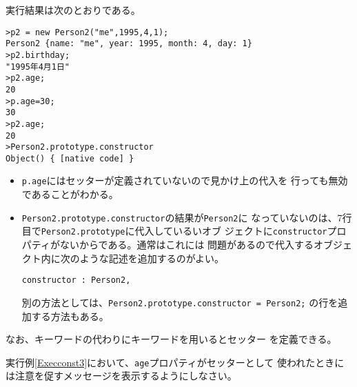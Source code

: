  実行結果は次のとおりである。
\begin{Verbatim}
>p2 = new Person2("me",1995,4,1);
Person2 {name: "me", year: 1995, month: 4, day: 1}
>p2.birthday;
"1995年4月1日"
>p2.age;
20
>p.age=30;
30
>p2.age;
20
>Person2.prototype.constructor
Object() { [native code] }
\end{Verbatim}
\begin{itemize}
 \item \texttt{p.age}にはセッターが定義されていないので見かけ上の代入を
       行っても無効であることがわかる。
 \item \texttt{Person2.prototype.constructor}の結果が\texttt{Person2}に
なっていないのは、7行目で\texttt{Person2.prototype}に代入しているいオブ
ジェクトに\texttt{constructor}プロパティがないからである。通常はこれには
問題があるので代入するオブジェクト内に次のような記述を追加するのがよい。
\begin{Verbatim}
constructor : Person2,
\end{Verbatim}
別の方法としては、\texttt{Person2.prototype.constructor = Person2;}
の行を追加する方法もある。
\end{itemize}

なお、キーワードの代わりにキーワードを用いるとセッター
を定義できる。

\begin{Prob}\upshape
 実行例\ref{Execconst3}において、\texttt{age}プロパティがセッターとして
 使われたときには注意を促すメッセージを表示するようにしなさい。
\end{Prob}
